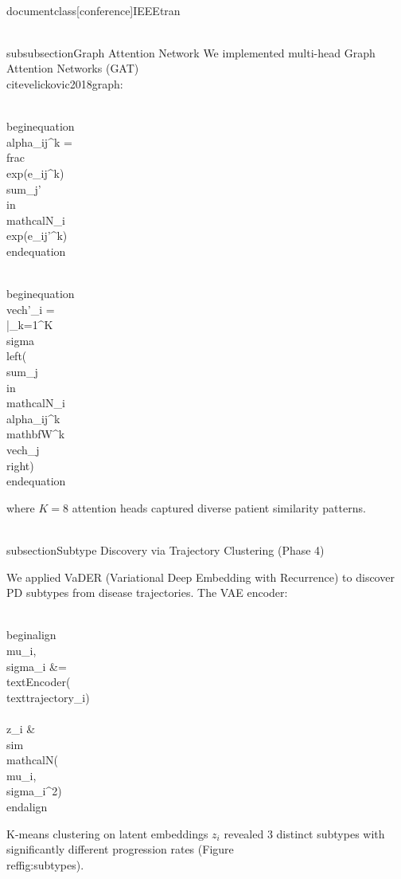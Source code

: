 \\documentclass[conference]{IEEEtran}
\begin{document}
\\subsubsection{Graph Attention Network}
We implemented multi-head Graph Attention Networks (GAT) \\cite{velickovic2018graph}:

\\begin{equation}
\\alpha_{ij}^k = \\frac{\\exp(e_{ij}^k)}{\\sum_{j'  \\in \\mathcal{N}_i} \\exp(e_{ij'}^k)}
\\end{equation}

\\begin{equation}
\\vec{h}'_i = \\|_{k=1}^K \\sigma\\left(\\sum_{j \\in \\mathcal{N}_i} \\alpha_{ij}^k \\mathbf{W}^k\\vec{h}_j\\right)
\\end{equation}

where $K=8$ attention heads captured diverse patient similarity patterns.

\\subsection{Subtype Discovery via Trajectory Clustering (Phase 4)}

We applied VaDER (Variational Deep Embedding with Recurrence) to discover PD subtypes from disease trajectories. The VAE encoder:

\\begin{align}
\\mu_i, \\sigma_i &= \\text{Encoder}(\\text{trajectory}_i) \\\\
z_i &\\sim \\mathcal{N}(\\mu_i, \\sigma_i^2)
\\end{align}

K-means clustering on latent embeddings $z_i$ revealed 3 distinct subtypes with significantly different progression rates (Figure \\ref{fig:subtypes}).
\end{document}
